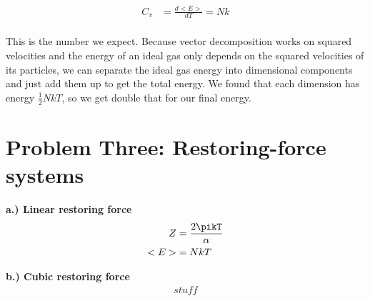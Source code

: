\documentclass[10pt]{article} %
\begin{document}
\begin{align*}
  C_v &= \frac{d<E>}{dT} = Nk\\
\end{align*}

This is the number we expect. Because vector decomposition works on squared velocities and the
energy of an ideal gas only depends on the squared velocities of its particles, we can separate
the ideal gas energy into dimensional components and just add them up to get the total energy.
We found that each dimension has energy $\frac{1}{2}NkT$, so we get double that for our final
energy.\\

\section{Problem Three: Restoring-force systems}

\textbf{a.) Linear restoring force}
\begin{align*}
  Z &= \frac{2\pikT}{\alpha}\\
  <E> &= NkT\\
\end{align*}

\textbf{b.) Cubic restoring force}
\begin{align*}
  stuff
\end{align*}
\end{document}
